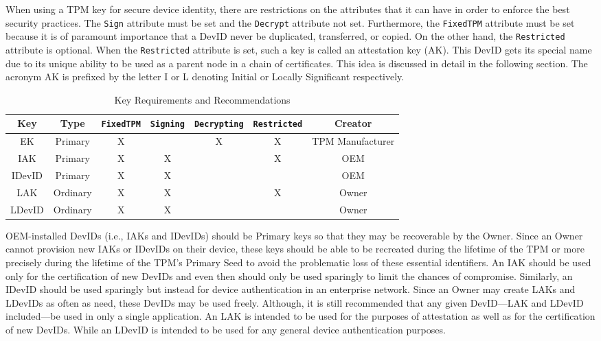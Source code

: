 When using a TPM key for secure device identity, there are restrictions on the attributes that it can have in order to enforce the best security practices. The \verb|Sign| attribute must be set and the \verb|Decrypt| attribute not set. Furthermore, the \verb|FixedTPM| attribute must be set because it is of paramount importance that a DevID never be duplicated, transferred, or copied. On the other hand, the \verb|Restricted| attribute is optional. When the \verb|Restricted| attribute is set, such a key is called an attestation key (AK). This DevID gets its special name due to its unique ability to be used as a parent node in a chain of certificates. This idea is discussed in detail in the following section. The acronym AK is prefixed by the letter I or L denoting Initial or Locally Significant respectively. 
\begin{table}[h]
  \begin{center}
    \scriptsize 
    \sffamily
    \renewcommand{\arraystretch}{1.5}
    \begin{tabular}{ |c|c|c|c|c|c|c| }
      \hline
      Key & Type & \verb|FixedTPM| & \verb|Signing| & \verb|Decrypting| & \verb|Restricted| & Creator \\
      \hline
      \hline
      EK & Primary       & X &   & X & X & TPM Manufacturer \\
      \hline
      IAK & Primary      & X & X &   & X & OEM \\
      \hline
      IDevID & Primary   & X & X &   &   & OEM \\
      \hline
      LAK & Ordinary     & X & X &   & X & Owner \\
      \hline
      LDevID & Ordinary  & X & X &   &   & Owner \\
      \hline
    \end{tabular}
    \caption{Key Requirements and Recommendations}
    \label{fig:req_and_recs}
  \end{center}
\end{table}
 OEM-installed DevIDs (i.e., IAKs and IDevIDs) should be Primary keys so that they may be recoverable by the Owner. Since an Owner cannot provision new IAKs or IDevIDs on their device, these keys should be able to be recreated during the lifetime of the TPM or more precisely during the lifetime of the TPM’s Primary Seed to avoid the problematic loss of these essential identifiers. An IAK should be used only for the certification of new DevIDs and even then should only be used sparingly to limit the chances of compromise. Similarly, an IDevID should be used sparingly but instead for device authentication in an enterprise network. Since an Owner may create LAKs and LDevIDs as often as need, these DevIDs may be used freely. Although, it is still recommended that any given DevID---LAK and LDevID included---be used in only a single application. An LAK is intended to be used for the purposes of attestation as well as for the certification of new DevIDs. While an LDevID is intended to be used for any general device authentication purposes.

